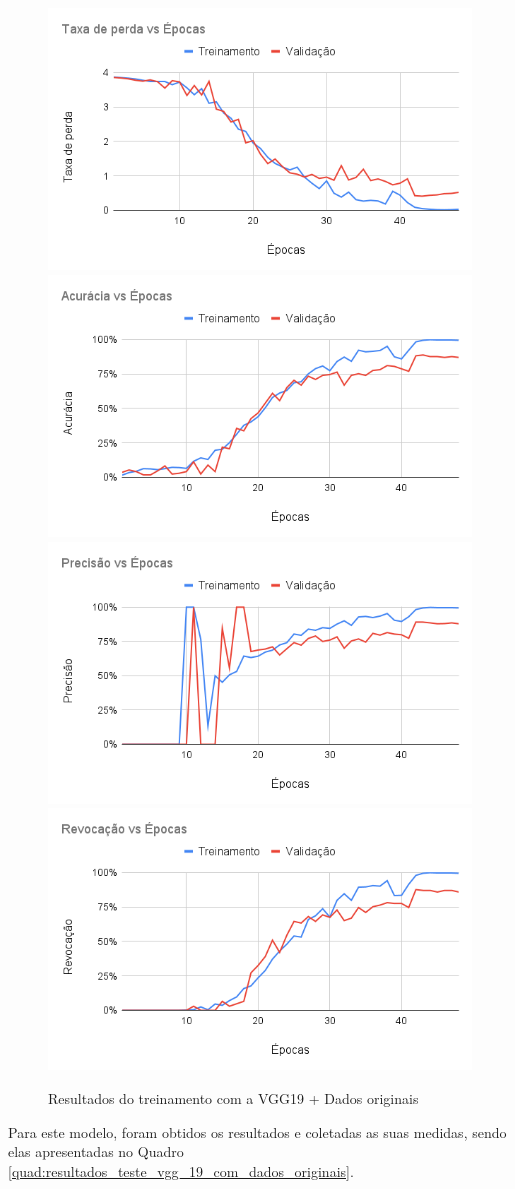 \documentclass[
	12pt,				%
	oneside,			%
	a4paper,			%
	english,			%
	brazil				%
	]{abntex2ppgsi}
\begin{document}
\begin{figure}[H]
    \centering
    \caption{Resultados do treinamento com a VGG19 + Dados originais}
    \includegraphics[width=.50\textwidth]{imagens/resultados_discussao/architecture/vgg_19/original/perda.png}\hfill
    \includegraphics[width=.50\textwidth]{imagens/resultados_discussao/architecture/vgg_19/original/acuracia.png}\bigbreak    \includegraphics[width=.50\textwidth]{imagens/resultados_discussao/architecture/vgg_19/original/precisao.png}\hfill
    \includegraphics[width=.50\textwidth]{imagens/resultados_discussao/architecture/vgg_19/original/revocacao.png}
    \label{fig:vgg_19_dados_originais}
\end{figure}

Para este modelo, foram obtidos os resultados e coletadas as suas medidas, sendo elas apresentadas no Quadro \ref{quad:resultados_teste_vgg_19_com_dados_originais}.
\end{document}
